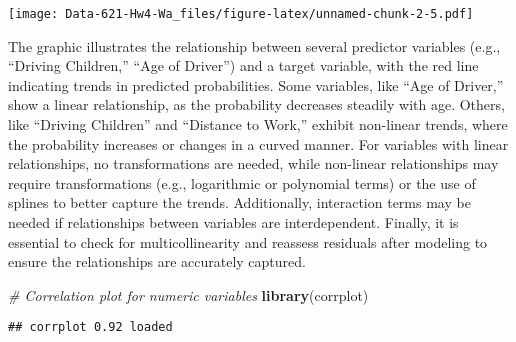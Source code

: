 \documentclass[
]{article}
\newenvironment{Shaded}{\begin{snugshade}}{\end{snugshade}}
\newcommand{\AttributeTok}[1]{\textcolor[rgb]{0.13,0.29,0.53}{#1}}
\newcommand{\CommentTok}[1]{\textcolor[rgb]{0.56,0.35,0.01}{\textit{#1}}}
\newcommand{\DecValTok}[1]{\textcolor[rgb]{0.00,0.00,0.81}{#1}}
\newcommand{\FloatTok}[1]{\textcolor[rgb]{0.00,0.00,0.81}{#1}}
\newcommand{\FunctionTok}[1]{\textcolor[rgb]{0.13,0.29,0.53}{\textbf{#1}}}
\newcommand{\NormalTok}[1]{#1}
\newcommand{\SpecialCharTok}[1]{\textcolor[rgb]{0.81,0.36,0.00}{\textbf{#1}}}
\newcommand{\StringTok}[1]{\textcolor[rgb]{0.31,0.60,0.02}{#1}}
\begin{document}
\begin{Shaded}
\end{Shaded}

\texttt{[image: Data-621-Hw4-Wa\_files/figure-latex/unnamed-chunk-2-5.pdf]}

The graphic illustrates the relationship between several predictor
variables (e.g., ``Driving Children,'' ``Age of Driver'') and a target
variable, with the red line indicating trends in predicted
probabilities. Some variables, like ``Age of Driver,'' show a linear
relationship, as the probability decreases steadily with age. Others,
like ``Driving Children'' and ``Distance to Work,'' exhibit non-linear
trends, where the probability increases or changes in a curved manner.
For variables with linear relationships, no transformations are needed,
while non-linear relationships may require transformations (e.g.,
logarithmic or polynomial terms) or the use of splines to better capture
the trends. Additionally, interaction terms may be needed if
relationships between variables are interdependent. Finally, it is
essential to check for multicollinearity and reassess residuals after
modeling to ensure the relationships are accurately captured.

\begin{Shaded}
\begin{Highlighting}[]
\CommentTok{\# Correlation plot for numeric variables}
\FunctionTok{library}\NormalTok{(corrplot)}
\end{Highlighting}
\end{Shaded}

\begin{verbatim}
## corrplot 0.92 loaded
\end{verbatim}
\end{document}
